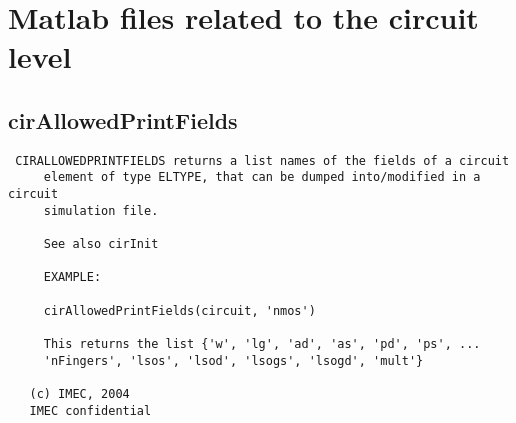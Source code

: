 \section{Matlab files related to the circuit level}
\subsection{cirAllowedPrintFields}
\label{sec:cirAllowedPrintFields}
\begin{verbatim}
 CIRALLOWEDPRINTFIELDS returns a list names of the fields of a circuit
     element of type ELTYPE, that can be dumped into/modified in a circuit
     simulation file. 
 
     See also cirInit
 
     EXAMPLE:
 
     cirAllowedPrintFields(circuit, 'nmos')
 
     This returns the list {'w', 'lg', 'ad', 'as', 'pd', 'ps', ...
     'nFingers', 'lsos', 'lsod', 'lsogs', 'lsogd', 'mult'}
 
   (c) IMEC, 2004
   IMEC confidential 
 

\end{verbatim}

\newpage
